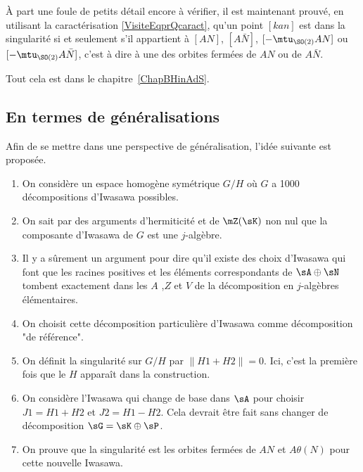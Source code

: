 À part une foule de petits détail encore à vérifier, il est maintenant prouvé, en utilisant la caractérisation \eqref{VisiteEqprQcaract}, qu'un point $[kan]$ est dans la singularité si et seulement s'il appartient à $[AN]$, $[A\bar N]$, $[-\mtu_{\SO(2)}AN]$ ou $[-\mtu_{\SO(2)}A\bar N]$, c'est à dire à une des orbites fermées de $AN$ ou de $A\bar N$.


Tout cela est dans le chapitre~\ref{ChapBHinAdS}.

\subsection{En termes de généralisations}

Afin de se mettre dans une perspective de généralisation, l'idée suivante est proposée.

\begin{enumerate}

	\item



On considère un espace homogène symétrique $G/H$ où $G$ a 1000 décompositions d'Iwasawa possibles.

\item
 On sait par des arguments d'hermiticité et de $\mZ(\sK)$ non nul que la composante d'Iwasawa de $G$ est une $j$-algèbre.

\item
Il y a sûrement un argument pour dire qu'il existe des choix d'Iwasawa qui font que les racines positives et les éléments correspondants de $\sA\oplus\sN$ tombent exactement dans les $A$ ,$Z$ et $V $ de la décomposition en $j$-algèbres élémentaires.

\item
On choisit cette décomposition particulière d'Iwasawa comme décomposition "de référence".

\item
 On définit la singularité sur $G/H$ par $\| H1+H2\|=0$. Ici, c'est la première fois que le $H$ apparaît dans la construction.

 \item
 On considère l'Iwasawa qui change de base dans $\sA$ pour choisir $J1=H1+H2$ et $J2=H1-H2$. Cela devrait être fait sans changer de décomposition $\sG=\sK\oplus\sP$.

\item		\label{ItemVGDern}
 On prouve que la singularité est les orbites fermées de $AN$ et $A\theta(N)$ pour cette nouvelle Iwasawa.
\end{enumerate}


